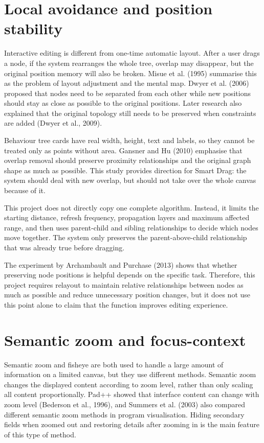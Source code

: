 \section{Local avoidance and position stability}

Interactive editing is different from one-time automatic layout. After a user drags a node, if the system rearranges the whole tree, overlap may disappear, but the original position memory will also be broken. Misue et al. (1995) summarise this as the problem of layout adjustment and the mental map. Dwyer et al. (2006) proposed that nodes need to be separated from each other while new positions should stay as close as possible to the original positions. Later research also explained that the original topology still needs to be preserved when constraints are added (Dwyer et al., 2009).

Behaviour tree cards have real width, height, text and labels, so they cannot be treated only as points without area. Gansner and Hu (2010) emphasise that overlap removal should preserve proximity relationships and the original graph shape as much as possible. This study provides direction for Smart Drag: the system should deal with new overlap, but should not take over the whole canvas because of it.

This project does not directly copy one complete algorithm. Instead, it limits the starting distance, refresh frequency, propagation layers and maximum affected range, and then uses parent-child and sibling relationships to decide which nodes move together. The system only preserves the parent-above-child relationship that was already true before dragging.

The experiment by Archambault and Purchase (2013) shows that whether preserving node positions is helpful depends on the specific task. Therefore, this project requires relayout to maintain relative relationships between nodes as much as possible and reduce unnecessary position changes, but it does not use this point alone to claim that the function improves editing experience.

\section{Semantic zoom and focus-context}

Semantic zoom and fisheye are both used to handle a large amount of information on a limited canvas, but they use different methods. Semantic zoom changes the displayed content according to zoom level, rather than only scaling all content proportionally. Pad++ showed that interface content can change with zoom level (Bederson et al., 1996), and Summers et al. (2003) also compared different semantic zoom methods in program visualisation. Hiding secondary fields when zoomed out and restoring details after zooming in is the main feature of this type of method.

